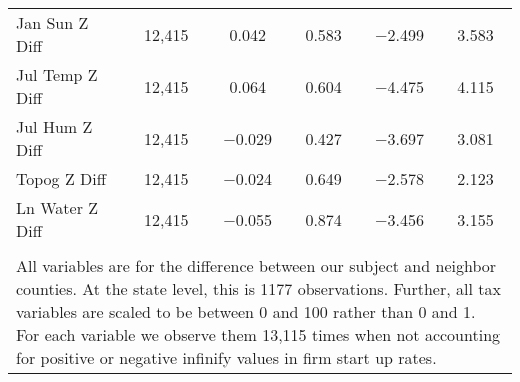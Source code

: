 \begin{table}[!htbp]
\begin{tabular}{@{\extracolsep{5pt}}lccccc}
Jan Sun Z Diff & 12,415 & 0.042 & 0.583 & $-$2.499 & 3.583 \\ 
Jul Temp Z Diff & 12,415 & 0.064 & 0.604 & $-$4.475 & 4.115 \\ 
Jul Hum Z Diff & 12,415 & $-$0.029 & 0.427 & $-$3.697 & 3.081 \\ 
Topog Z Diff & 12,415 & $-$0.024 & 0.649 & $-$2.578 & 2.123 \\ 
Ln Water Z Diff & 12,415 & $-$0.055 & 0.874 & $-$3.456 & 3.155 \\ 
\hline \\[-1.8ex] 
\multicolumn{6}{l}{All variables are for the difference between our subject and neighbor counties. At the state level, this is 1177 observations. Further, all tax variables are scaled to be between 0 and 100 rather than 0 and 1. For each variable we observe them 13,115 times when not accounting for positive or negative infinify values in firm start up rates.} \\ 
\end{tabular} 
\end{table} 
